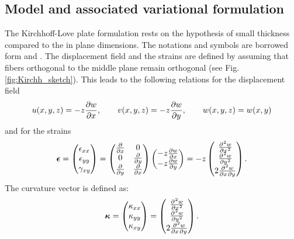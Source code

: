 \documentclass[11pt]{article}
\begin{document}
	\subsection{Model and associated variational formulation}
	\label{sec:VarKir}
	The Kirchhoff-Love plate formulation rests on the hypothesis of small thickness compared to the in plane dimensions. The notations and symbols are borrowed form \cite{FEM_Cook} and \cite{Oslo}. The displacement field and the strains are defined by assuming that fibers orthogonal to the middle plane remain orthogonal (see Fig. \ref{fig:Kirchh_sketch}). This leads to the following relations for the displacement field
	\begin{equation}
	u(x,y,z) = -z \diffp{w}{x}, \qquad v(x,y,z) = -z \diffp{w}{y}, \qquad 
	w(x,y,z) = w(x,y)
	\end{equation}
	and for the strains
	\begin{equation}
	\bm{\epsilon} =  
	\begin{pmatrix}
	\epsilon_{xx} \\
	\epsilon_{yy} \\
	\gamma_{xy} \\
	\end{pmatrix}  = 
	\begin{pmatrix}
	\diffp{}{x} & 0 \\
	0 & \diffp{}{y} \\
	\diffp{}{y} & \diffp{}{x} \\
	\end{pmatrix}
	\begin{pmatrix}
	-z \diffp{w}{x}\\
	-z \diffp{w}{y}\\
	\end{pmatrix} = 
	-z
	\begin{pmatrix}
	\diffp[2]{w}{x} \\
	\diffp[2]{w}{y} \\
	2 \diffp{w}{x,y} \\
	\end{pmatrix}. 
	\end{equation}
	The curvature vector is defined as:
	\begin{equation}
	\label{eq:CurVec}
	\bm{\kappa} = 
	\begin{pmatrix}
	\kappa_{xx} \\
	\kappa_{yy} \\
	\kappa_{xy} \\
	\end{pmatrix} = 
	\begin{pmatrix}
	\diffp[2]{w}{x} \\
	\diffp[2]{w}{y} \\
	2 \diffp{w}{x,y} \\
	\end{pmatrix}.
	\end{equation}
	
\end{document}

